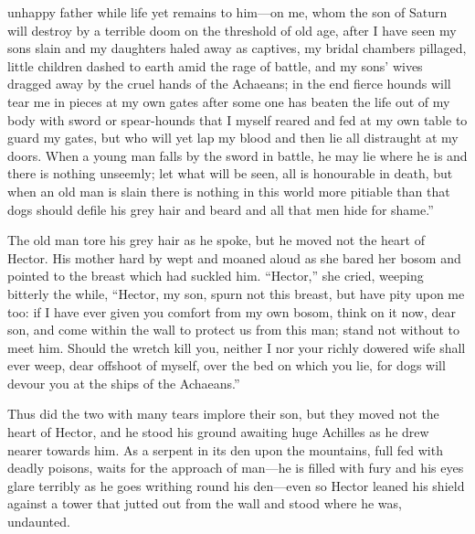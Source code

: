unhappy father while life yet remains to him—on me, whom the son of
Saturn will destroy by a terrible doom on the threshold of old age, after
I have seen my sons slain and my daughters haled away as captives, my
bridal chambers pillaged, little children dashed to earth amid the rage of
battle, and my sons’ wives dragged away by the cruel hands of the
Achaeans; in the end fierce hounds will tear me in pieces at my own gates
after some one has beaten the life out of my body with sword or
spear-hounds that I myself reared and fed at my own table to guard my
gates, but who will yet lap my blood and then lie all distraught at my
doors. When a young man falls by the sword in battle, he may lie where he
is and there is nothing unseemly; let what will be seen, all is honourable
in death, but when an old man is slain there is nothing in this world more
pitiable than that dogs should defile his grey hair and beard and all that
men hide for shame.”

The old man tore his grey hair as he spoke, but he moved not the heart of
Hector. His mother hard by wept and moaned aloud as she bared her bosom
and pointed to the breast which had suckled him. “Hector,” she cried,
weeping bitterly the while, “Hector, my son, spurn not this breast, but
have pity upon me too: if I have ever given you comfort from my own bosom,
think on it now, dear son, and come within the wall to protect us from
this man; stand not without to meet him. Should the wretch kill you,
neither I nor your richly dowered wife shall ever weep, dear offshoot of
myself, over the bed on which you lie, for dogs will devour you at the
ships of the Achaeans.”

Thus did the two with many tears implore their son, but they moved not the
heart of Hector, and he stood his ground awaiting huge Achilles as he drew
nearer towards him. As a serpent in its den upon the mountains, full fed
with deadly poisons, waits for the approach of man—he is filled with
fury and his eyes glare terribly as he goes writhing round his den—even
so Hector leaned his shield against a tower that jutted out from the wall
and stood where he was, undaunted.

